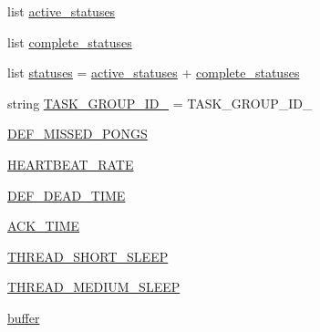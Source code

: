 \begin{DoxyCompactItemize}
\item 
list \hyperlink{namespaceparlai_1_1mturk_1_1core_1_1legacy__2018_1_1test_1_1test__socket__manager_afb3b2221a40a97e650023997b3bb0464}{active\+\_\+statuses}
\item 
list \hyperlink{namespaceparlai_1_1mturk_1_1core_1_1legacy__2018_1_1test_1_1test__socket__manager_a6d27c2a613a280e6c5db4853684e3107}{complete\+\_\+statuses}
\item 
list \hyperlink{namespaceparlai_1_1mturk_1_1core_1_1legacy__2018_1_1test_1_1test__socket__manager_ad1b4884bb96f3684b5f71adf9532a232}{statuses} = \hyperlink{namespaceparlai_1_1mturk_1_1core_1_1legacy__2018_1_1test_1_1test__socket__manager_afb3b2221a40a97e650023997b3bb0464}{active\+\_\+statuses} + \hyperlink{namespaceparlai_1_1mturk_1_1core_1_1legacy__2018_1_1test_1_1test__socket__manager_a6d27c2a613a280e6c5db4853684e3107}{complete\+\_\+statuses}
\item 
string \hyperlink{namespaceparlai_1_1mturk_1_1core_1_1legacy__2018_1_1test_1_1test__socket__manager_aa9595cd2242928626778eff627311222}{T\+A\+S\+K\+\_\+\+G\+R\+O\+U\+P\+\_\+\+I\+D\+\_} = \textquotesingle{}T\+A\+S\+K\+\_\+\+G\+R\+O\+U\+P\+\_\+\+I\+D\+\_\textquotesingle{}
\item 
\hyperlink{namespaceparlai_1_1mturk_1_1core_1_1legacy__2018_1_1test_1_1test__socket__manager_a56755224b3e1dbc4e4367b4858548923}{D\+E\+F\+\_\+\+M\+I\+S\+S\+E\+D\+\_\+\+P\+O\+N\+GS}
\item 
\hyperlink{namespaceparlai_1_1mturk_1_1core_1_1legacy__2018_1_1test_1_1test__socket__manager_aa425a400d5d1fd994e3927ec217a49d0}{H\+E\+A\+R\+T\+B\+E\+A\+T\+\_\+\+R\+A\+TE}
\item 
\hyperlink{namespaceparlai_1_1mturk_1_1core_1_1legacy__2018_1_1test_1_1test__socket__manager_a0d8446b05f99d7fca504cf886ae1f1bc}{D\+E\+F\+\_\+\+D\+E\+A\+D\+\_\+\+T\+I\+ME}
\item 
\hyperlink{namespaceparlai_1_1mturk_1_1core_1_1legacy__2018_1_1test_1_1test__socket__manager_a17b08ad99b754b3558b76225b6ac5245}{A\+C\+K\+\_\+\+T\+I\+ME}
\item 
\hyperlink{namespaceparlai_1_1mturk_1_1core_1_1legacy__2018_1_1test_1_1test__socket__manager_ad3bedec252c9a6c81673a028fb376d48}{T\+H\+R\+E\+A\+D\+\_\+\+S\+H\+O\+R\+T\+\_\+\+S\+L\+E\+EP}
\item 
\hyperlink{namespaceparlai_1_1mturk_1_1core_1_1legacy__2018_1_1test_1_1test__socket__manager_af78de5afaf3a526601e11062054ee993}{T\+H\+R\+E\+A\+D\+\_\+\+M\+E\+D\+I\+U\+M\+\_\+\+S\+L\+E\+EP}
\item 
\hyperlink{namespaceparlai_1_1mturk_1_1core_1_1legacy__2018_1_1test_1_1test__socket__manager_a932d0cd921a4d7152f4dd40dd1eccd11}{buffer}
\end{DoxyCompactItemize}


